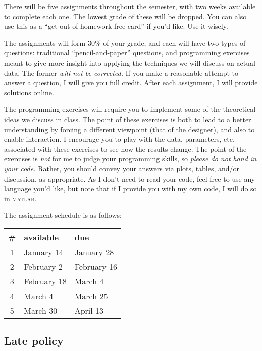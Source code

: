 \documentclass{article}
\newcommand{\acro}[1]{\textsc{\MakeLowercase{#1}}}
\begin{document}
There will be five assignments throughout the semester, with two weeks
available to complete each one.  The lowest grade of these will be
dropped.  You can also use this as a ``get out of homework free card''
if you'd like.  Use it wisely.

The assignments will form 30\% of your grade, and each will have two
types of questions: traditional ``pencil-and-paper'' questions, and
programming exercises meant to give more insight into applying the
techniques we will discuss on actual data.  The former \emph{will not
  be corrected.}  If you make a reasonable attempt to answer a
question, I will give you full credit.  After each assignment, I will
provide solutions online.

The programming exercises will require you to implement some of the
theoretical ideas we discuss in class.  The point of these exercises
is both to lead to a better understanding by forcing a different
viewpoint (that of the designer), and also to enable interaction.  I
encourage you to play with the data, parameters, etc. associated with
these exercises to see how the results change.  The point of the
exercises is \emph{not} for me to judge your programming skills, so
\emph{please do not hand in your code.}  Rather, you should convey
your answers via plots, tables, and/or discussion, as appropriate.  As
I don't need to read your code, feel free to use any language you'd
like, but note that if I provide you with my own code, I will do so in
\acro{MATLAB}.

The assignment schedule is as follows:
\begin{center}
  \begin{tabular}{cll}
    \toprule
    \# & available   & due         \\
    \midrule
    1  & January 14  & January 28  \\
    2  & February 2  & February 16 \\
    3  & February 18 & March 4     \\
    4  & March 4     & March 25    \\
    5  & March 30    & April 13    \\
    \bottomrule
  \end{tabular}
\end{center}

\subsection*{Late policy}
\end{document}
